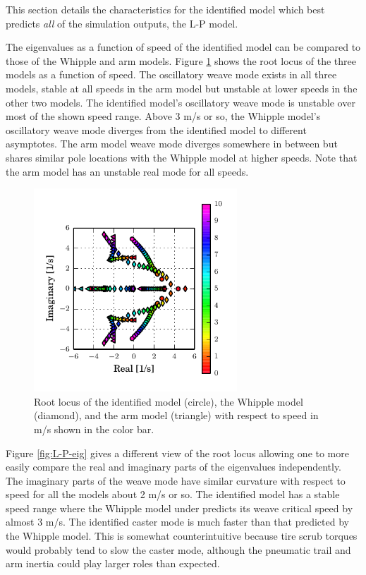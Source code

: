 \documentclass[a4paper]{article}
\begin{document}
This section details the characteristics for the identified model which best
predicts \emph{all} of the simulation outputs, the L-P model.

The eigenvalues as a function of speed of the identified model can be compared
to those of the Whipple and arm models. Figure \ref{fig:L-P-rlocus} shows the
root locus of the three models as a function of speed. The oscillatory weave
mode exists in all three models, stable at all speeds in the arm model but
unstable at lower speeds in the other two models. The identified model's
oscillatory weave mode is unstable over most of the shown speed range. Above 3
m/s or so, the Whipple model's oscillatory weave mode diverges from the
identified model to different asymptotes. The arm model weave mode diverges
somewhere in between but shares similar pole locations with the Whipple model
at higher speeds. Note that the arm model has an unstable real mode for all
speeds.

\begin{figure}
  \centering
  \includegraphics[width=3in]{figures/L-P-rlocus.pdf}
  \caption{Root locus of the identified model (circle), the Whipple model
    (diamond), and the arm model (triangle) with respect to speed in m/s shown
    in the color bar.}
  \label{fig:L-P-rlocus}
\end{figure}

Figure \ref{fig:L-P-eig} gives a different view of the root locus allowing one
to more easily compare the real and imaginary parts of the eigenvalues
independently. The imaginary parts of the weave mode have similar curvature
with respect to speed for all the models about 2 m/s or so. The identified
model has a stable speed range where the Whipple model under predicts its weave
critical speed by almost 3 m/s. The identified caster mode is much faster than
that predicted by the Whipple model. This is somewhat counterintuitive because
tire scrub torques would probably tend to slow the caster mode, although the
pneumatic trail and arm inertia could play larger roles than expected.
\end{document}

